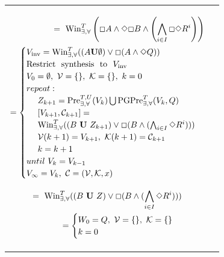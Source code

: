\begin{table}
\footnotesize
\begin{tabular}{ll}
	\begin{minipage}{0.5\textwidth}
		\begin{align}
		[V_{\infty},\mathcal{C}] =\  \text{Win}_{\exists, \forall}^{T}\left(\Square A \wedge \Diamond \Square B \wedge \left( \bigwedge_{i\in I} \Square \Diamond R^i\right)\right)\nonumber\\
		=\begin{cases}V_{\text{inv}} = \text{\text{Win}}^{T}_{\exists, \forall} ((A\mathbf{U}\emptyset)\vee \Square (A\wedge \Diamond Q))\\
		\text{Restrict~ synthesis~ to~ }V_{\text{inv}}\\
		V_0 = \emptyset,\ \mathcal{V}=\{\},\ \mathcal{K} = \{\},\  {\color{black} k=0}\\
		{\color{black} repeat:}\\
		\ \ \ \ Z_{k+1} = \text{Pre}_{\exists,\forall}^{T,U} (V_k) \bigcup \text{PGPre}_{\exists,\forall}^{T} (V_k, Q)\\
		\ \ \ \ [V_{k+1}, \mathcal{C}_{k+1}]=\\\ \ \ \ \text{Win}_{\exists,\forall}^{T} ((B \mathbf{\ U\ }Z_{k+1}) \vee \Square (B\wedge ( \bigwedge_{i\in I}\Diamond R^i)))\\
		\ \ \ \ \mathcal{V}(k+1)=V_{k+1},\ \mathcal{K}(k+1) = \mathcal{C}_{k+1}\\
		\ \ \ \ {\color{black} k=k+1}\\
		{\color{black} until \ V_{k} = V_{k-1}}\\
		V_{\infty} = V_k,\ \mathcal{C}=(\mathcal{V},\mathcal{K},x)
		\end{cases}\label{win-phi}
		\end{align}
	\end{minipage}
	\begin{minipage}{0.5\textwidth}
		\begin{align}
		[W_{\infty},\mathcal{C}]= \ \text{Win}_{\exists,\forall}^{T}((B\mathbf{\ U\ }Z)\vee \Square (B\wedge(\bigwedge_{i\in I}\Diamond R^i)) )\nonumber\\
		=\begin{cases}
		W_0 = Q,\ \mathcal{V}=\{\},\ \mathcal{K}=\{\}\\ {\color{black} k=0}\\

\end{cases}
\end{align}
\end{minipage}
\end{tabular}
\end{table}
